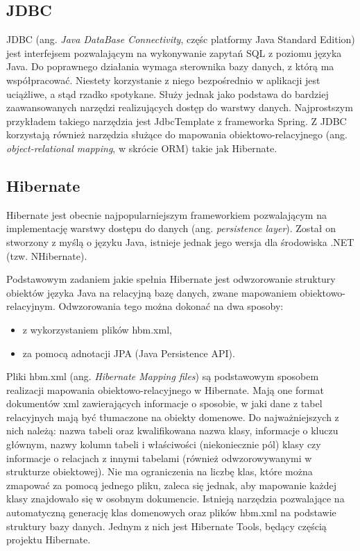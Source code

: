
\subsection[JDBC][JDBC]{JDBC}
JDBC (ang. \textit{Java DataBase Connectivity}, częśc platformy Java Standard Edition) jest interfejsem pozwalającym na wykonywanie zapytań SQL z poziomu języka Java. Do poprawnego działania wymaga sterownika bazy danych, z którą ma współpracować. Niestety korzystanie z niego bezpośrednio w aplikacji jest uciążliwe, a stąd rzadko spotykane. Służy jednak jako podstawa do bardziej zaawansowanych narzędzi realizujących dostęp do warstwy danych. Najprostszym przykładem takiego narzędzia jest JdbcTemplate z frameworka Spring. Z JDBC korzystają również narzędzia służące do mapowania obiektowo-relacyjnego (ang. \textit{object-relational mapping}, w skrócie ORM) takie jak Hibernate.

\subsection[Hibernate][Hibernate]{Hibernate}
\label{hibernate}
Hibernate jest obecnie najpopularniejszym frameworkiem pozwalającym na implementację warstwy dostępu do danych (ang. \textit{persistence layer}). Został on stworzony z myślą o języku Java, istnieje jednak jego wersja dla środowiska .NET (tzw. NHibernate).

Podstawowym zadaniem jakie spełnia Hibernate jest odwzorowanie struktury obiektów języka Java na relacyjną bazę danych, zwane mapowaniem obiektowo-relacyjnym. Odwzorowania tego można dokonać na dwa sposoby:
\begin{itemize}
	\item z wykorzystaniem plików hbm.xml,
	\item za pomocą adnotacji JPA (Java Persistence API).
\end{itemize}

Pliki hbm.xml (ang. \textit{Hibernate Mapping files}) są podstawowym sposobem realizacji mapowania obiektowo-relacyjnego w Hibernate. Mają one format dokumentów xml zawierających informacje o sposobie, w jaki dane z tabel relacyjnych mają być tłumaczone na obiekty domenowe. Do najważniejszych z nich należą: nazwa tabeli oraz kwalifikowana nazwa klasy, informacje o kluczu głównym, nazwy kolumn tabeli i właściwości (niekoniecznie pól) klasy czy  informacje o relacjach z innymi tabelami (również odwzorowywanymi w strukturze obiektowej). Nie ma ograniczenia na liczbę klas, które można zmapować za pomocą jednego pliku, zaleca się jednak, aby mapowanie każdej klasy znajdowało się w osobnym dokumencie. Istnieją narzędzia pozwalające na automatyczną generację klas domenowych oraz plików hbm.xml na podstawie struktury bazy danych. Jednym z nich jest Hibernate Tools, będący częścią projektu Hibernate.

